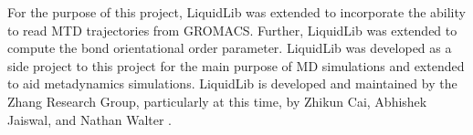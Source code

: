 For the purpose of this project, LiquidLib was extended to incorporate the ability to read MTD trajectories from GROMACS.  Further, LiquidLib was extended to compute the bond orientational order parameter.  LiquidLib was developed as a side project to this project for the main purpose of MD simulations and extended to aid metadynamics simulations.  LiquidLib is developed and maintained by the Zhang Research Group, particularly at this time, by Zhikun Cai, Abhishek Jaiswal, and Nathan Walter \cite{LiquidLib}.